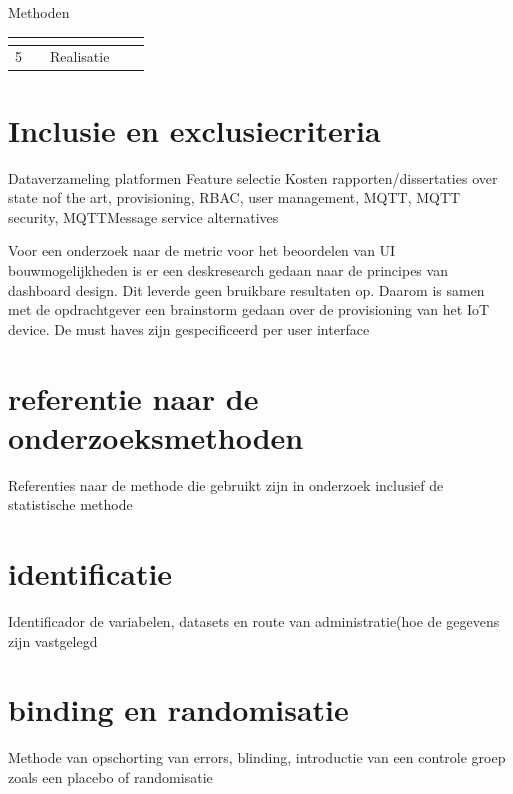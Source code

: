\begin{frame}[shrink=40]{Methoden}
\begin{table}[htbp]
\begin{tabular}{|c|c|c|c|c|}
{			}&
			\multicolumn{1}{m{4cm}|}{ }&\multicolumn{1}{m{3cm}|}{ }\\\hline
			
			5&\multicolumn{1}{m{2cm}|}{ }&\multicolumn{1}{m{3cm}|}{ Realisatie
				
			}&
			\multicolumn{1}{m{4cm}|}{ }&\multicolumn{1}{m{3cm}|}{ }\\\hline
			
			
			
		\end{tabular}
	\end{table}
	
\end{frame}





\section{Inclusie en exclusiecriteria}
Dataverzameling platformen
Feature selectie
Kosten
rapporten/dissertaties over state nof the art, provisioning, RBAC, user management, MQTT, MQTT security, MQTTMessage service alternatives


Voor een onderzoek naar de metric voor het beoordelen van UI bouwmogelijkheden  is er een deskresearch gedaan naar de principes van dashboard design. Dit leverde geen bruikbare resultaten op. Daarom is samen met de opdrachtgever een brainstorm gedaan over de provisioning van het IoT device. De must haves zijn gespecificeerd per user interface


\section{referentie naar de onderzoeksmethoden}
Referenties naar de methode die gebruikt zijn in onderzoek inclusief de statistische methode

\section{identificatie}
Identificador de variabelen, datasets en route van administratie(hoe de gegevens zijn vastgelegd

\section{binding en randomisatie}
Methode van opschorting van errors, blinding, introductie van een controle groep zoals een placebo of randomisatie


